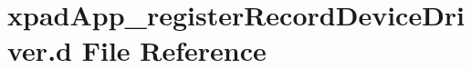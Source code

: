 \hypertarget{xpadApp__registerRecordDeviceDriver_8d}{\section{xpad\-App\-\_\-register\-Record\-Device\-Driver.\-d \-File \-Reference}
\label{xpadApp__registerRecordDeviceDriver_8d}
}
